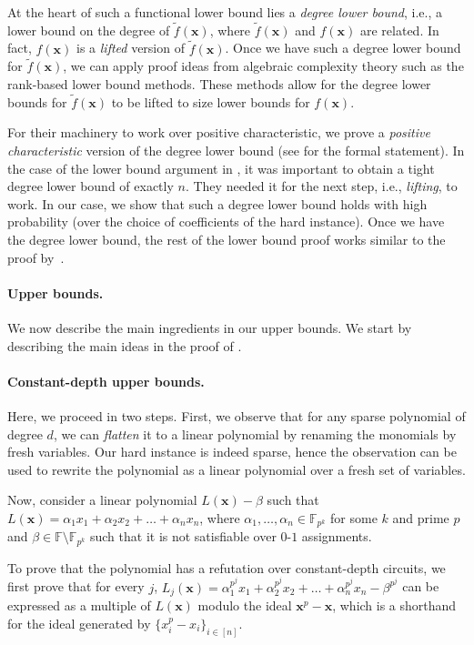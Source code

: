 \documentclass[11pt]{article}
\newcommand{\xbar}{\mathbf{x}}
\begin{document}
At the heart of such a functional lower bound lies a \emph{degree lower bound}, i.e., a lower bound on the degree of $\tilde{f}(\xbar)$, where $\tilde{f}(\xbar)$ and $f(\xbar)$ are related. In fact, $f(\xbar)$ is a \emph{lifted} version of $\tilde{f}(\xbar)$. Once we have such a degree lower bound for $\tilde{f}(\xbar)$, we can apply proof ideas from algebraic complexity theory such as the rank-based lower bound methods. These methods allow for the degree lower bounds for $\tilde{f}(\xbar)$ to be lifted to size lower bounds for $f(\xbar)$.

For their machinery to work over positive characteristic, 
we prove a \emph{positive characteristic} version of the degree lower bound (see  for the formal statement). In the case of the lower bound argument in \cite{FSTW21}, it was important to obtain a tight degree lower bound of exactly $n$. They needed it for the next step, i.e., \emph{lifting}, to work. In our case, we show that such a degree lower bound holds with high probability (over the choice of coefficients of the hard instance). Once we have the degree lower bound, the rest of the lower bound proof works similar to the proof by~\cite{FSTW21}. 


\paragraph{Upper bounds.}
We now describe the main ingredients in our upper bounds. We start by describing the main ideas in the proof of . 

\paragraph{Constant-depth upper bounds.} Here, we proceed in two steps. First, we observe that for any sparse polynomial of degree $d$, we can \emph{flatten} it to a linear polynomial by renaming the monomials by fresh variables. Our hard instance is indeed sparse, hence the observation can be used to rewrite the polynomial as a linear polynomial over a fresh set of variables. 

Now, consider a linear polynomial $L(\xbar) - \beta$ such that $L(\xbar) = \alpha_1 x_1 + \alpha_2 x_2 + \ldots + \alpha_n x_n$, where $\alpha_1, \ldots, \alpha_n \in \mathbb{F}_{p^k}$ for some $k$ and prime $p$ and $\beta \in \mathbb{F}\setminus \mathbb{F}_{p^k}$ such that it is not satisfiable over $0$-$1$ assignments. 


To prove that the polynomial has a refutation over constant-depth circuits, we first prove that for every $j$, $L_j(\xbar) = \alpha_1^{p^j} x_1 + \alpha_2^{p^j} x_2 + \ldots + \alpha_n^{p^j} x_n -  \beta^{p^{j}}$ can be expressed as a multiple of $L(\xbar)$ modulo the ideal $\xbar^p - \xbar$, which is a shorthand for the ideal generated by $\{x_i^p - x_i\}_{i \in [n]}$. 
\end{document}
